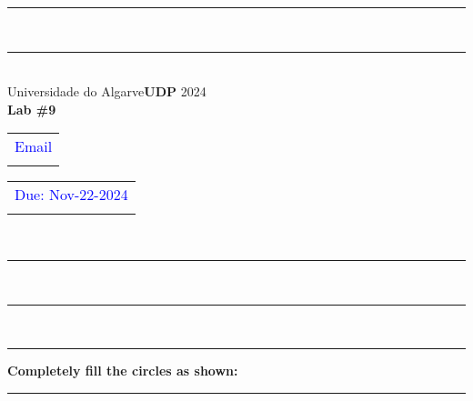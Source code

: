 \documentclass{article}
\begin{document}
\begin{center}
\rule{\textwidth}{.0075in} \\
\rule[3mm]{\textwidth}{.0075in}\\

Universidade do Algarve\hfill \textbf{UDP} \hfill 2024\\[3ex]

{\Large\bf Lab \#9} \\[3ex]

\begin{tabular}{l}
\textcolor{blue}{Email} \\ \hfill 
\end{tabular}
\begin{tabular}{l}
\textcolor{blue}{Due: Nov-22-2024} \\ \hfill 
\end{tabular}\\

\rule{\textwidth}{.0075in} \\
\rule[3mm]{\textwidth}{.0075in} \\
\end{center}


\begin{center}
\rule{\textwidth}{0.4pt}
\textbf{Completely fill the circles as shown: \Circle \Circle \CIRCLE \Circle}
\rule{\textwidth}{0.4pt}
\end{center}
\end{document}
